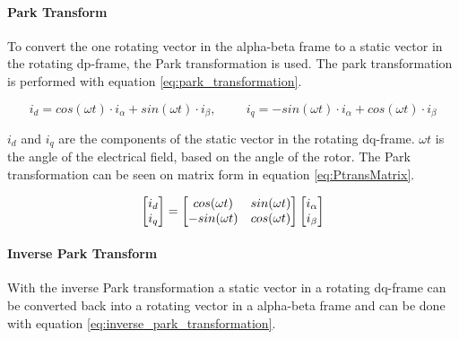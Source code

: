 \paragraph{Park Transform}
To convert the one rotating vector in the alpha-beta frame to a static vector in the rotating dp-frame, the Park transformation is used. The park transformation is performed with equation \ref{eq:park_transformation}.

\begin{equation}
    i_{d} = cos(\omega t) \cdot i_{\alpha} + sin(\omega t) \cdot i_{\beta}
    , \hspace{1cm}
    i_{q} = -sin(\omega t) \cdot i_{\alpha} + cos(\omega t) \cdot i_{\beta}
    \label{eq:park_transformation}
\end{equation}

$i_d$ and $i_q$ are the components of the static vector in the rotating dq-frame. $\omega t$ is the angle of the electrical field, based on the angle of the rotor.
The Park transformation can be seen on matrix form in equation \ref{eq:PtransMatrix}.


\begin{equation}
    \centering
    \begin{bmatrix}
        i_{d} \\ 
        i_{q}
    \end{bmatrix}
    =
    \begin{bmatrix}
       cos(\omega t) & sin(\omega t) \\
       -sin(\omega t) & cos(\omega t)
    \end{bmatrix}
    \begin{bmatrix}
        i_{\alpha} \\ 
        i_{\beta}
    \end{bmatrix}
    \label{eq:PtransMatrix}
\end{equation}





\paragraph{Inverse Park Transform}
With the inverse Park transformation a static vector in a rotating dq-frame can be converted back into a rotating vector in a alpha-beta frame and can be done with equation \ref{eq:inverse_park_transformation}.


